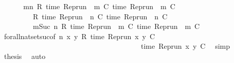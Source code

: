 \begin{isabellebody}
%
\isatagproof
{}\isamarkupfalse%
\ {\isacharminus}\isanewline
\ \ \isamarkupfalse%
\ {\isacartoucheopen}{\isacharbraceleft}{\isasymrho}{\isachardot}\ {\isasymforall}m{\isasymge}n{\isachardot}\ R\ {\isacharparenleft}time\ {\isacharparenleft}{\isacharparenleft}Rep{\isacharunderscore}run\ {\isasymrho}{\isacharparenright}\ m\ C\ time\ {\isacharparenleft}{\isacharparenleft}Rep{\isacharunderscore}run\ {\isasymrho}{\isacharparenright}\ m\ C\isanewline
\ \ \ \ \ \ \ {\isacharequal}\ {\isacharbraceleft}{\isasymrho}{\isachardot}\ R\ {\isacharparenleft}time\ {\isacharparenleft}{\isacharparenleft}Rep{\isacharunderscore}run\ {\isasymrho}{\isacharparenright}\ n\ C\ time\ {\isacharparenleft}{\isacharparenleft}Rep{\isacharunderscore}run\ {\isasymrho}{\isacharparenright}\ n\ C\isanewline
\ \ \ \ \ \ \ {\isasyminter}\ {\isacharbraceleft}{\isasymrho}{\isachardot}\ {\isasymforall}m{\isasymge}Suc\ n{\isachardot}\ R\ {\isacharparenleft}time\ {\isacharparenleft}{\isacharparenleft}Rep{\isacharunderscore}run\ {\isasymrho}{\isacharparenright}\ m\ C\ time\ {\isacharparenleft}{\isacharparenleft}Rep{\isacharunderscore}run\ {\isasymrho}{\isacharparenright}\ m\ C\isanewline
\ \ \ \ \isamarkupfalse%
\ forall{\isacharunderscore}nat{\isacharunderscore}set{\isacharunderscore}suc{\isacharbrackleft}of\ {\isacartoucheopen}n{\isacartoucheclose}\ {\isacartoucheopen}{\isasymlambda}x\ y{\isachardot}\ R\ {\isacharparenleft}time\ {\isacharparenleft}{\isacharparenleft}Rep{\isacharunderscore}run\ x{\isacharparenright}\ y\ C\isanewline
\ \ \ \ \ \ \ \ \ \ \ \ \ \ \ \ \ \ \ \ \ \ \ \ \ \ \ \ \ \ \ \ \ \ \ \ \ \ \ time\ {\isacharparenleft}{\isacharparenleft}Rep{\isacharunderscore}run\ x{\isacharparenright}\ y\ C\ \isamarkupfalse%
\ simp\isanewline
\ \ \isamarkupfalse%
\ {\isacharquery}thesis\ \isamarkupfalse%
\ auto\isanewline
{}\isamarkupfalse%
%
\endisatagproof
{\isafoldproof}%

\end{isabellebody}
